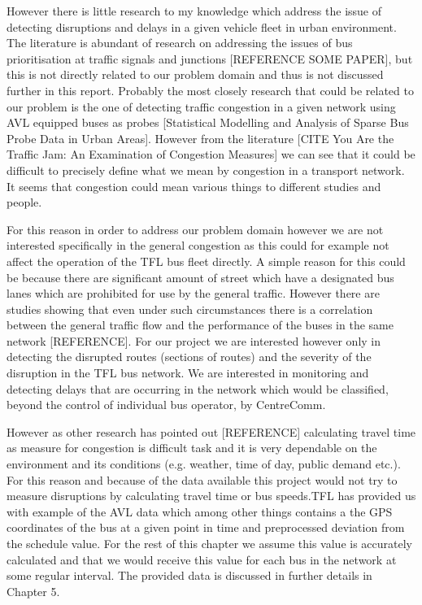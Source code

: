 However there is little research to my knowledge which address the issue of detecting disruptions and delays in a given vehicle fleet in urban environment. The literature is abundant of research on addressing the issues of bus prioritisation at traffic signals and junctions [REFERENCE SOME PAPER], but this is not directly related to our problem domain and thus is not discussed further in this report. Probably the most closely research that could be related to our problem is the one of detecting traffic congestion in a given network using AVL equipped buses as probes [Statistical Modelling and Analysis of Sparse Bus Probe Data in Urban Areas]. However from the literature [CITE You Are the Traffic Jam: An Examination of Congestion Measures] we can see that it could be difficult to precisely define what we mean by congestion in a transport network. It seems that congestion could mean various things to different studies and people. 

For this reason in order to address our problem domain however we are not interested specifically in the general congestion as this could for example not affect the operation of the TFL bus fleet directly. A simple reason for this could be because there are significant amount of street which have a designated bus lanes which are prohibited for use by the general traffic. However there are studies showing that even under such circumstances there is a correlation between the general traffic flow and the performance of the buses in the same network [REFERENCE]. For our project we are interested however only in detecting the disrupted routes (sections of routes) and the severity of the disruption in the TFL bus network. We are interested in monitoring and detecting delays that are occurring in the network which would be classified, beyond the control of individual bus operator, by CentreComm.

However as other research has pointed out [REFERENCE] calculating travel time as measure for congestion is difficult task and it is very dependable on the environment and its conditions (e.g. weather, time of day, public demand etc.). For this reason and because of the data available this project would not try to measure disruptions by calculating travel time or bus speeds.TFL has provided us with example of the AVL data which among other things contains a the GPS coordinates of the bus at a given point in time and preprocessed deviation from the schedule value. For the rest of this chapter we assume this value is accurately calculated and that we would receive this value for each bus in the network at some regular interval. The provided data is discussed in further details in Chapter 5.

